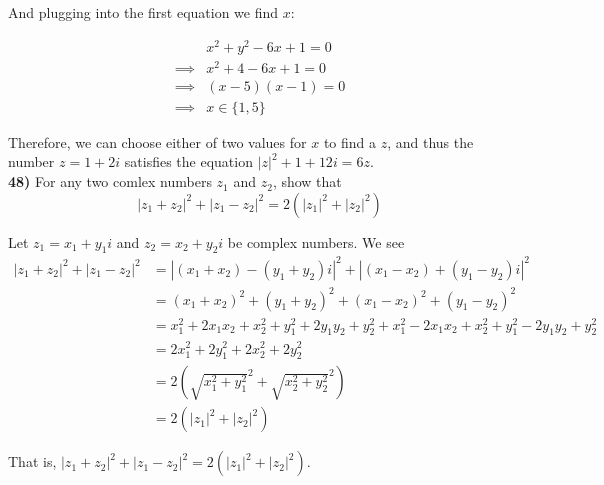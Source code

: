 \documentclass{scrartcl}
\begin{document}
And plugging into the first equation we find $x$:

\begin{align*}
  &x^2 + y^2 -6x + 1 = 0\\
  \implies &x^2 + 4 - 6x + 1 = 0\\
  \implies &(x-5)(x-1) = 0\\
  \implies &x \in \{1,5\}
\end{align*}

Therefore, we can choose either of two values for $x$ to find a $z$, and thus the number $z=1+2i$ satisfies the equation $|z|^2+1+12i=6z$.\\

\textbf{48)} For any two comlex numbers $z_1$ and $z_2$, show that
\begin{displaymath}
  |z_1 + z_2|^2 + |z_1 - z_2|^2 =2(|z_1|^2 + |z_2|^2)
\end{displaymath}

Let $z_1=x_1+y_1i$ and $z_2=x_2+y_2i$ be complex numbers. We see
\begin{align*}
  |z_1+z_2|^2 + |z_1 - z_2|^2 &= |(x_1+x_2)-(y_1+y_2)i|^2 + |(x_1-x_2)+(y_1-y_2)i|^2\\
  &= (x_1+x_2)^2 + (y_1+y_2)^2 + (x_1-x_2)^2 + (y_1-y_2)^2\\
  &= x_1^2 + 2x_1x_2 +x_2^2 + y_1^2 + 2y_1y_2 + y_2^2 + x_1^2 - 2x_1x_2 + x_2^2 + y_1^2 - 2y_1y_2 + y_2^2\\
  &= 2x_1^2 + 2y_1^2 + 2x_2^2 + 2y_2^2\\
  &=2\left(\sqrt{x_1^2 + y_1^2}^2 + \sqrt{x_2^2 + y_2^2}^2\right)\\
  &=2\left(|z_1|^2 + |z_2|^2\right)
\end{align*}

That is, $|z_1+z_2|^2 + |z_1 - z_2|^2 = 2\left(|z_1|^2 + |z_2|^2\right)$.
\end{document}
